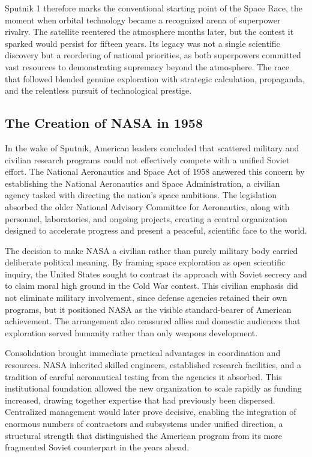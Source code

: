 Sputnik 1 therefore marks the conventional starting point of the Space Race, the moment when orbital technology became a recognized arena of superpower rivalry. The satellite reentered the atmosphere months later, but the contest it sparked would persist for fifteen years. Its legacy was not a single scientific discovery but a reordering of national priorities, as both superpowers committed vast resources to demonstrating supremacy beyond the atmosphere. The race that followed blended genuine exploration with strategic calculation, propaganda, and the relentless pursuit of technological prestige. \cite{mcdougall1985} \cite{siddiqi2010}

\subsection{The Creation of NASA in 1958}
In the wake of Sputnik, American leaders concluded that scattered military and civilian research programs could not effectively compete with a unified Soviet effort. The National Aeronautics and Space Act of 1958 answered this concern by establishing the National Aeronautics and Space Administration, a civilian agency tasked with directing the nation's space ambitions. The legislation absorbed the older National Advisory Committee for Aeronautics, along with personnel, laboratories, and ongoing projects, creating a central organization designed to accelerate progress and present a peaceful, scientific face to the world.

The decision to make NASA a civilian rather than purely military body carried deliberate political meaning. By framing space exploration as open scientific inquiry, the United States sought to contrast its approach with Soviet secrecy and to claim moral high ground in the Cold War contest. This civilian emphasis did not eliminate military involvement, since defense agencies retained their own programs, but it positioned NASA as the visible standard-bearer of American achievement. The arrangement also reassured allies and domestic audiences that exploration served humanity rather than only weapons development.

Consolidation brought immediate practical advantages in coordination and resources. NASA inherited skilled engineers, established research facilities, and a tradition of careful aeronautical testing from the agencies it absorbed. This institutional foundation allowed the new organization to scale rapidly as funding increased, drawing together expertise that had previously been dispersed. Centralized management would later prove decisive, enabling the integration of enormous numbers of contractors and subsystems under unified direction, a structural strength that distinguished the American program from its more fragmented Soviet counterpart in the years ahead.

